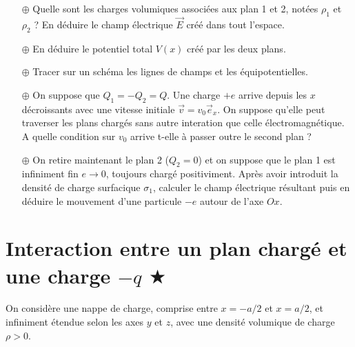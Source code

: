 \documentclass{report}
\begin{document}
\begin{itemize}

	\item[$\oplus$] Quelle sont les charges volumiques associées aux plan 1 et 2, notées $\rho_1$ et $\rho_2$ ? En déduire le champ électrique $\vec{E}$ créé dans tout l'espace.

	\item[$\oplus$] En déduire le potentiel total $V(x)$ créé par les deux plans.
	
	\item[$\oplus$] Tracer sur un schéma les lignes de champs et les équipotentielles. 
	
	\item[$\oplus$] On suppose que $Q_1=-Q_2=Q$. Une charge $+e$ arrive depuis les $x$ décroissants avec une vitesse initiale $\vec{v}=v_0\vec{e}_x$. On suppose qu'elle peut traverser les plans chargés sans autre interation que celle électromagnétique. A quelle condition sur $v_0$ arrive t-elle à passer outre le second plan ? 
	
	\item[$\oplus$] On retire maintenant le plan 2 ($Q_2=0$) et on suppose que le plan 1 est infiniment fin $e\longrightarrow0$, toujours chargé positiviment. Après avoir introduit la densité de charge surfacique $\sigma_1$, calculer le champ électrique résultant puis en déduire le mouvement d'une particule $-e$ autour de l'axe $Ox$.

\end{itemize}

\newpage

\section*{Interaction entre un plan chargé et une charge $-q$ $\bigstar$}

On considère une nappe de charge, comprise entre $x=-a/2$ et $x=a/2$, et infiniment étendue selon les axes $y$ et $z$, avec une densité volumique de charge $\rho>0$.
\end{document}
